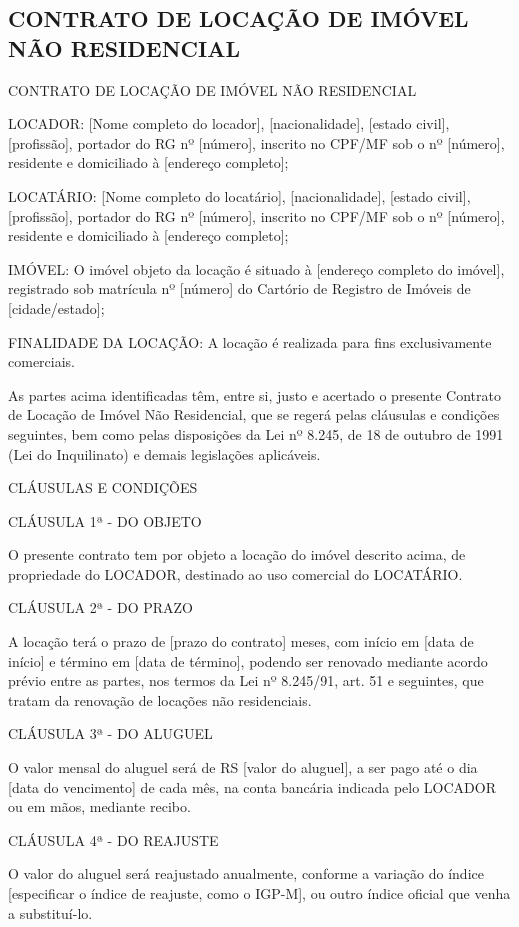 \begin{anexosenv}
\chapter{CONTRATO DE LOCAÇÃO DE IMÓVEL NÃO RESIDENCIAL}

CONTRATO DE LOCAÇÃO DE IMÓVEL NÃO RESIDENCIAL

LOCADOR: [Nome completo do locador], [nacionalidade], [estado civil], [profissão], portador do RG nº [número], inscrito no CPF/MF sob o nº [número], residente e domiciliado à [endereço completo];

LOCATÁRIO: [Nome completo do locatário], [nacionalidade], [estado civil], [profissão], portador do RG nº [número], inscrito no CPF/MF sob o nº [número], residente e domiciliado à [endereço completo];

IMÓVEL: O imóvel objeto da locação é situado à [endereço completo do imóvel], registrado sob matrícula nº [número] do Cartório de Registro de Imóveis de [cidade/estado];

FINALIDADE DA LOCAÇÃO: A locação é realizada para fins exclusivamente comerciais.

As partes acima identificadas têm, entre si, justo e acertado o presente Contrato de Locação de Imóvel Não Residencial, que se regerá pelas cláusulas e condições seguintes, bem como pelas disposições da Lei nº 8.245, de 18 de outubro de 1991 (Lei do Inquilinato) e demais legislações aplicáveis.

CLÁUSULAS E CONDIÇÕES

CLÁUSULA 1ª - DO OBJETO

O presente contrato tem por objeto a locação do imóvel descrito acima, de propriedade do LOCADOR, destinado ao uso comercial do LOCATÁRIO.

CLÁUSULA 2ª - DO PRAZO

A locação terá o prazo de [prazo do contrato] meses, com início em [data de início] e término em [data de término], podendo ser renovado mediante acordo prévio entre as partes, nos termos da Lei nº 8.245/91, art. 51 e seguintes, que tratam da renovação de locações não residenciais.

CLÁUSULA 3ª - DO ALUGUEL

O valor mensal do aluguel será de RS [valor do aluguel], a ser pago até o dia [data do vencimento] de cada mês, na conta bancária indicada pelo LOCADOR ou em mãos, mediante recibo.


CLÁUSULA 4ª - DO REAJUSTE

O valor do aluguel será reajustado anualmente, conforme a variação do índice [especificar o índice de reajuste, como o IGP-M], ou outro índice oficial que venha a substituí-lo.


\end{anexosenv}
